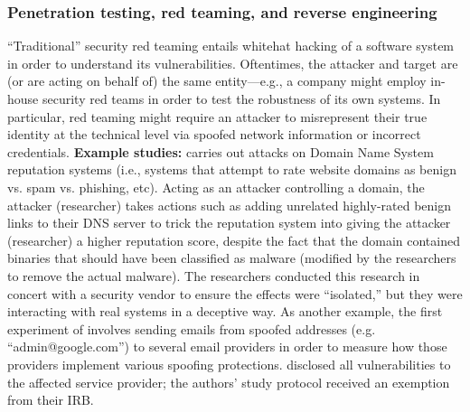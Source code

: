 \subsubsection{Penetration testing, red teaming, and reverse engineering} 
\label{sec:pentesting}
``Traditional'' security red teaming entails whitehat hacking of a software system in order to understand its vulnerabilities. Oftentimes, the attacker and target are (or are acting on behalf of) the same entity---e.g., a company might employ in-house security red teams in order to test the robustness of its own systems. In particular, red teaming might require an attacker to misrepresent their true identity at the technical level via spoofed network information or incorrect credentials.
\textbf{Example studies:} 
\cite{gallowayPracticalAttacksDNS2024} carries out attacks on Domain Name System reputation systems (i.e., systems that attempt to rate website domains as benign vs. spam vs. phishing, etc). Acting as an attacker controlling a domain, the attacker (researcher) takes actions such as adding unrelated highly-rated benign links to their DNS server to trick the reputation system into giving the attacker (researcher) a higher reputation score, despite the fact that the domain contained binaries that should have been classified as malware (modified by the researchers to remove the actual malware). The researchers conducted this research in concert with a security vendor to ensure the effects were ``isolated,'' but they were interacting with real systems in a deceptive way.
As another example, the first experiment of \cite{maFakeBehalfImperceptibleEmail} involves sending emails from spoofed addresses (e.g. ``admin@google.com'') to several email providers in order to measure how those providers implement various spoofing protections. \cite{maFakeBehalfImperceptibleEmail} disclosed all vulnerabilities to the affected service provider; the authors' study protocol received an exemption from their IRB. 



